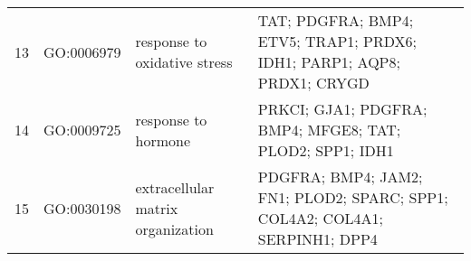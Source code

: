 \begin{table}[htp]
\begin{center}
\begin{tabular}{|c|c|p{1.5in}|p{4in}|}
13 & GO:0006979 & response to oxidative stress & \footnotesize{TAT; PDGFRA; BMP4; ETV5; TRAP1; PRDX6; IDH1; PARP1; AQP8; PRDX1; CRYGD} \\ 
14 & GO:0009725 & response to hormone & \footnotesize{PRKCI; GJA1; PDGFRA; BMP4; MFGE8; TAT; PLOD2; SPP1; IDH1} \\ 
15 & GO:0030198 & extracellular matrix organization & \footnotesize{PDGFRA; BMP4; JAM2; FN1; PLOD2; SPARC; SPP1; COL4A2; COL4A1; SERPINH1; DPP4} \\ 

\end{tabular}
\end{center}
\end{table}
